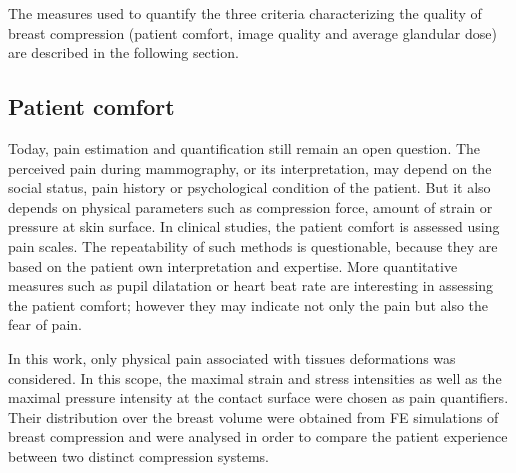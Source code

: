 The measures used to quantify the three criteria characterizing the quality of breast compression (patient comfort, image quality and average glandular dose) are described in the following section.  

\subsection{Patient comfort}

Today, pain estimation and quantification still remain an open question. The perceived pain during mammography, or its interpretation, may depend on the social status, pain history or psychological condition of the patient. But it also depends on physical parameters such as compression force, amount of strain or pressure at skin surface. In clinical studies, the patient comfort is assessed using pain scales. The repeatability of such methods is questionable, because they are based on the patient own interpretation and expertise. More quantitative measures such as pupil dilatation or heart beat rate are interesting in assessing the patient comfort; however they may indicate not only the pain but also the fear of pain.        

In this work, only physical pain associated with tissues deformations was considered. In this scope, the maximal strain and stress intensities as well as the maximal pressure intensity at the contact surface were chosen as pain quantifiers. Their distribution over the breast volume were obtained from FE simulations of breast compression and were analysed in order to compare the patient experience between two distinct compression systems. 

